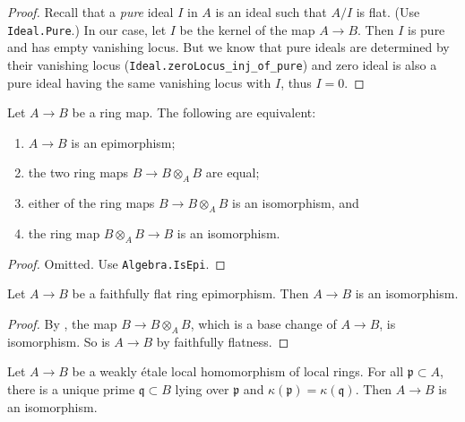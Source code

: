 \begin{proof}
    Recall that a \emph{pure} ideal $I$ in $A$ is an ideal such that $A/I$ is flat.
    (Use \verb|Ideal.Pure|.) In our case, let $I$ be the kernel of the map $A \to B$.
    Then $I$ is pure and has empty vanishing locus. But we know that pure ideals are determined by
    their vanishing locus (\verb`Ideal.zeroLocus_inj_of_pure`) and zero ideal is also a pure
    ideal having the same vanishing locus with $I$, thus $I = 0$.
\end{proof}

\begin{lemma}[\stacksproject{04VN}]
    \label{lem:ring-epi-tfae}
    Let $A \to B$ be a ring map. The following are equivalent:
    \begin{enumerate}
        \item $A \to B$ is an epimorphism;
        \item the two ring maps $B \to B \otimes_A B$ are equal;
        \item either of the ring maps $B \to B \otimes_A B$ is an isomorphism, and
        \item the ring map $B \otimes_A B \to B$ is an isomorphism.
    \end{enumerate}
\end{lemma}

\begin{proof}
    Omitted. Use \verb`Algebra.IsEpi`.
\end{proof}

\begin{lemma}[\stacksproject{04VU}]
    \label{lem:isom-of-ff-and-mul-isom}
    Let $A \to B$ be a faithfully flat ring epimorphism. Then $A \to B$ is an isomorphism.
    \leanok
\end{lemma}

\begin{proof}
    By , the map $B \to B \otimes_A B$, which is a base change of $A \to B$,
    is isomorphism. So is $A \to B$ by faithfully flatness.
\end{proof}

\begin{lemma}
    \label{lem:isom-of-unique-lying-over-and-residue-field-eq}
    Let $A \to B$ be a weakly étale local homomorphism of local rings. For all $\mathfrak{p} \subset A$,
    there is a unique prime $\mathfrak{q} \subset B$ lying over $\mathfrak{p}$ and
    $\kappa(\mathfrak{p}) = \kappa(\mathfrak{q})$. Then $A \to B$ is an isomorphism.
    \leanok
\end{lemma}

